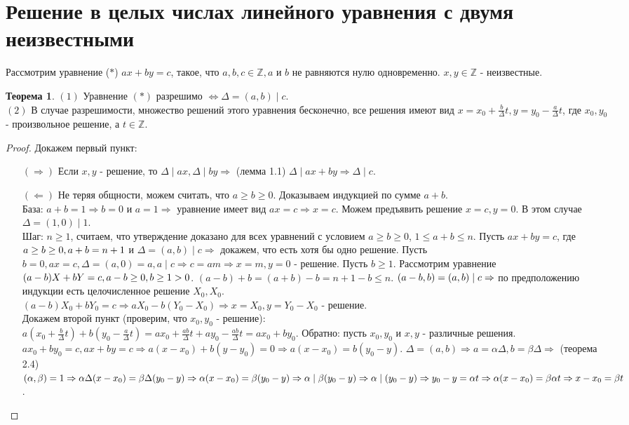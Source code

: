 \documentclass[a4paper, 12pt]{article}
\newcommand{\Z}{\mathbb{Z}}
\newcommand{\lra}{\Leftrightarrow}
\renewcommand{\div}{\mid}
\theoremstyle{definition}
\newtheorem{theorem}{Теорема}[section]
\begin{document}
    \section{Решение в целых числах линейного уравнения с двумя неизвестными}
    Рассмотрим уравнение ($*$) $ax+by=c$, такое, что $a,b,c\in \Z, a$ и $b$ не равняются нулю одновременно. $x,y\in \Z$ - неизвестные.
    \begin{theorem}
        $(1)$ Уравнение $(*)$ разрешимо $\lra \Delta = (a,b) \div c$.\\
        $(2)$ В случае разрешимости, множество решений этого уравнения бесконечно, все решения имеют вид $x=x_0+\frac{b}{\Delta}t, y=y_0-\frac{a}{\Delta}t$, где $x_0,y_0$ - произвольное решение, а $t\in \Z$.
    \end{theorem} 
    \begin{proof}
        Докажем первый пункт:
        \begin{itemize}
            \item[$(\Rightarrow)$] Если $x,y$ - решение, то $\Delta \div ax, \Delta \div by\Rightarrow$ (лемма 1.1) $\Delta \div ax+by\Rightarrow \Delta \div c$.
            \item[$(\Leftarrow)$] Не теряя общности, можем считать, что $a\geq b\geq 0$. Доказываем индукцией по сумме $a+b$. \\
            База: $a+b=1\Rightarrow b=0$ и $a=1 \Rightarrow$ уравнение имеет вид $ax=c\Rightarrow x=c$. Можем предъявить решение $x=c, y=0$. В этом случае $\Delta = (1,0) \div 1$. \\
            Шаг: $n\geq 1$, считаем, что утверждение доказано для всех уравнений с условием $a\geq b\geq 0$, $1\leq a+b\leq n$. Пусть $ax+by=c$, где $a\geq b\geq 0,\\ a+b=n+1$ и $\Delta = (a,b) \div c \Rightarrow$ докажем, что есть хотя бы одно решение. Пусть $b=0, ax=c, \Delta = (a,0)=a, a\div c\Rightarrow c=am\Rightarrow x=m, y=0$ - решение. Пусть $b\geq 1$. Рассмотрим уравнение $(a-b)X+bY=c,\\ a-b\geq 0, b\geq 1 >0$. $(a-b)+b=(a+b)-b=n+1-b\leq n$. $(a-b, b)=(a,b) \div c\\ \Rightarrow$ по предположению индукции есть целочисленное решение $X_0,X_0$. \\ $(a-b)X_0+bY_0=c\Rightarrow aX_0-b(Y_0-X_0)\Rightarrow x=X_0, y=Y_0-X_0$ - решение.\\
            Докажем второй пункт (проверим, что $x_0,y_0$ - решение):\\
            $a(x_0+\frac{b}{\Delta}t)+b(y_0-\frac{a}{\Delta}t)=ax_0+\frac{ab}{\Delta}t+ay_0-\frac{ab}{\Delta}t=ax_0+by_0$. Обратно: пусть $x_0,y_0$ и $x,y$ - различные решения. $ax_0+by_0=c, ax+by=c \Rightarrow a(x-x_0)+b(y-y_0)=0\Rightarrow a(x-x_0)=b(y_0-y)$. $\Delta = (a,b)\Rightarrow a=\alpha\Delta, b=\beta\Delta\Rightarrow$ (теорема 2.4) $(\alpha,\beta)=1\Rightarrow \alpha\Delta(x-x_0)=\beta\Delta(y_0-y)\Rightarrow \alpha(x-x_0)=\beta(y_0-y) \\ \Rightarrow \alpha \div \beta(y_0-y)\Rightarrow \alpha \div (y_0-y)\Rightarrow y_0-y=\alpha t\Rightarrow \alpha (x-x_0)=\beta \alpha t \Rightarrow x-x_0=\beta t$.
        \end{itemize}
    \end{proof} 
\end{document}

